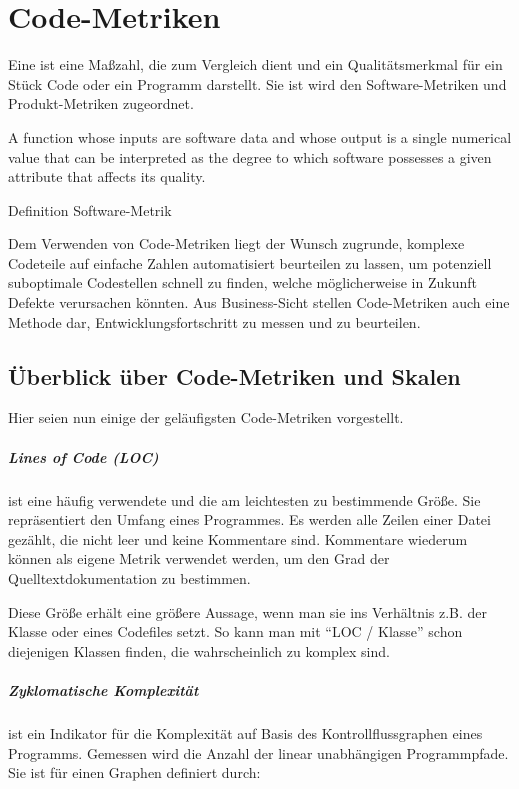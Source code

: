 \chapter{Code-Metriken}
\label{sec:metriken}
Eine  ist eine Maßzahl, die zum Vergleich dient und ein Qualitätsmerkmal für ein Stück Code oder ein Programm darstellt. Sie ist wird den Software-Metriken und Produkt-Metriken zugeordnet.

\epigraph{A function whose inputs are software data and whose output is a single
numerical value that can be interpreted as the degree to which software possesses a given attribute that affects its quality.}{Definition Software-Metrik \citep{ieee_1998}}

Dem Verwenden von Code-Metriken liegt der Wunsch zugrunde, komplexe Codeteile auf einfache Zahlen automatisiert beurteilen zu lassen, um potenziell suboptimale Codestellen schnell zu finden, welche möglicherweise in Zukunft Defekte verursachen könnten. Aus Business-Sicht stellen Code-Metriken auch eine Methode dar, Entwicklungsfortschritt zu messen und zu beurteilen.
\section{Überblick über Code-Metriken und Skalen}
Hier seien nun einige der geläufigsten Code-Metriken vorgestellt.
\paragraph{Lines of Code (LOC)} ist eine häufig verwendete und die am leichtesten zu bestimmende Größe. Sie repräsentiert den Umfang eines Programmes. Es werden alle Zeilen einer Datei gezählt, die nicht leer und keine Kommentare sind. Kommentare wiederum können als eigene Metrik verwendet werden, um den Grad der Quelltextdokumentation zu bestimmen.

Diese Größe erhält eine größere Aussage, wenn man sie ins Verhältnis z.B. der Klasse oder eines Codefiles setzt. So kann man mit "`LOC / Klasse"' schon diejenigen Klassen finden, die wahrscheinlich zu komplex sind. \\

\paragraph{Zyklomatische Komplexität} ist ein Indikator für die Komplexität auf Basis des Kontrollflussgraphen eines Programms. Gemessen wird die Anzahl der linear unabhängigen Programmpfade. Sie ist für einen Graphen definiert durch:

